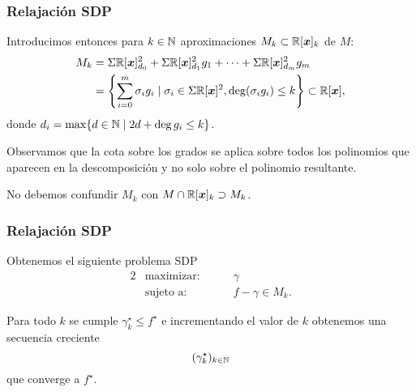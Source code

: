 \documentclass[aspectratio=169,12pt,spanish]{beamer}
\begin{document}
\begin{frame}

\frametitle{Relajación SDP}
Introducimos entonces para $k \in \mathbb{N}$ aproximaciones $M_k \subset \mathbb{R}[\bm{x}]_k$ de $M$:
\begin{align*}
M_k &= \Sigma\mathbb{R}[\bm{x}]^2_{d_0} + \Sigma\mathbb{R}[\bm{x}]^2_{d_1} g_1 + \cdots +  \Sigma\mathbb{R}[\bm{x}]^2_{d_m} g_m \\
&= \left\{ \sum_{i=0}^m \sigma_i g_i \mid \sigma_i \in \Sigma\mathbb{R}[\bm{x}]^2, \deg(\sigma_i g_i) \le k \right\} \subset \mathbb{R}[\bm{x}],
\end{align*}
donde $d_i = \max\{d \in \mathbb{N} \mid 2d + \deg g_i \le k\}$.

Observamos que la cota sobre los grados se aplica sobre todos los polinomios que aparecen en la descomposición y no solo sobre el polinomio resultante.

No debemos confundir $M_k$ con $M \cap \mathbb{R}[\bm{x}]_k \supset M_k$.

\end{frame}


\begin{frame}

\frametitle{Relajación SDP}


Obtenemos el siguiente problema SDP
\begin{alignat*}{2}
  & \text{maximizar: } & & \gamma  \\
  & \text{sujeto a: } & \quad & f - \gamma \in M_k.
\end{alignat*}

Para todo $k$ se cumple $\gamma_k^{\star} \le f^{\star}$ e incrementando el valor de $k$ obtenemos una secuencia creciente
$$(\gamma_k^{\star})_{k \in \mathbb{N}}$$
que converge a $f^{\star}$.



\end{frame}

\end{document}
